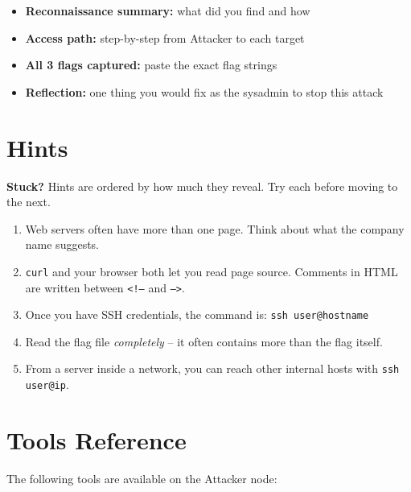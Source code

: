 \documentclass[a4paper, 12pt]{article}
\begin{document}
\begin{itemize}[leftmargin=1.5em]
  \item \textbf{Reconnaissance summary:} what did you find and how
  \item \textbf{Access path:} step-by-step from Attacker to each target
  \item \textbf{All 3 flags captured:} paste the exact flag strings
  \item \textbf{Reflection:} one thing you would fix as the sysadmin to stop this attack
\end{itemize}

\section{Hints}

\begin{mdframed}[backgroundcolor=labgray, linecolor=labred, linewidth=0.5pt]
\textbf{Stuck?} Hints are ordered by how much they reveal. Try each before moving to the next.

\begin{enumerate}[leftmargin=2em, topsep=4pt]
  \item Web servers often have more than one page. Think about what the company name suggests.
  \item \texttt{curl} and your browser both let you read page source. Comments in HTML are
        written between \texttt{<!--} and \texttt{-->}.
  \item Once you have SSH credentials, the command is: \texttt{ssh user@hostname}
  \item Read the flag file \textit{completely} -- it often contains more than the flag itself.
  \item From a server inside a network, you can reach other internal hosts with \texttt{ssh user@ip}.
\end{enumerate}
\end{mdframed}

\section{Tools Reference}

The following tools are available on the Attacker node:
\end{document}
